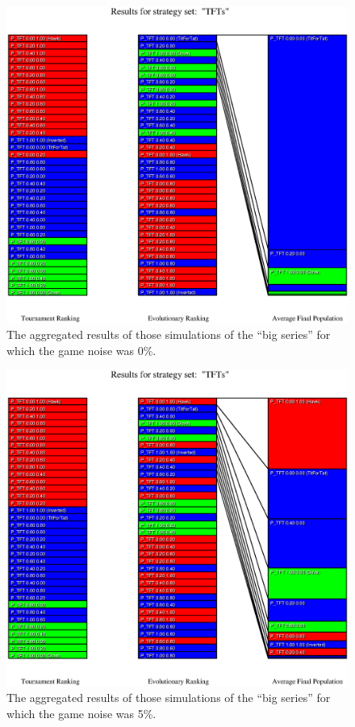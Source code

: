 \begin{figure}
\begin{center}
\includegraphics[width=20cm]{tables/TFTs_G0.000.eps}
\caption{\label{TFTs_G0000} The aggregated results of those
simulations of the ``big series'' for which the game noise was 0\%.}
\end{center}
\end{figure}

\begin{figure}
\begin{center}
\includegraphics[width=20cm]{tables/TFTs_G0.050.eps}
\caption{\label{TFTs_G0050} The aggregated results of those
simulations of the ``big series'' for which the game noise was 5\%.}
\end{center}
\end{figure}

